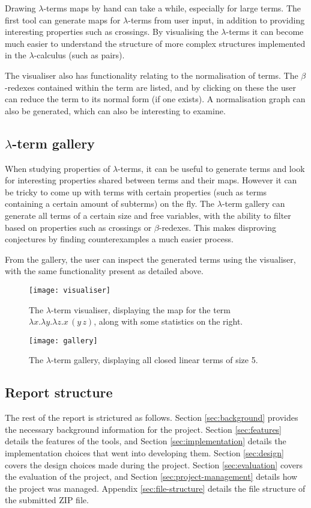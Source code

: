\documentclass[11pt]{article}
\begin{document}
Drawing $\lambda$-terms maps by hand can take a while, especially for large terms. The first tool can generate maps for $\lambda$-terms from user input, in addition to providing interesting properties such as crossings. By visualising the $\lambda$-terms it can become much easier to understand the structure of more complex structures implemented in the $\lambda$-calculus (such as pairs).

The visualiser also has functionality relating to the normalisation of terms. The $\beta$-redexes contained within the term are listed, and by clicking on these the user can reduce the term to its normal form (if one exists). A normalisation graph can also be generated, which can also be interesting to examine.

\subsection{\texorpdfstring{$\lambda$}{lambda}-term gallery}
When studying properties of $\lambda$-terms, it can be useful to generate terms and look for interesting properties shared between terms and their maps. However it can be tricky to come up with terms with certain properties (such as terms containing a certain amount of subterms) on the fly. The $\lambda$-term gallery can generate all terms of a certain size and free variables, with the ability to filter based on properties such as crossings or $\beta$-redexes. This makes disproving conjectures by finding counterexamples a much easier process.

From the gallery, the user can inspect the generated terms using the visualiser, with the same functionality present as detailed above.

\begin{figure}
    \centering
    \texttt{[image: visualiser]}
    \caption{The $\lambda$-term visualiser, displaying the map for the term $\lambda x. \lambda y. \lambda z. x \, (y \, z)$, along with some statistics on the right.}
    \label{fig:visualiser}
\end{figure}

\begin{figure}
    \centering
    \texttt{[image: gallery]}
    \caption{The $\lambda$-term gallery, displaying all closed linear terms of size 5.}
    \label{fig:gallery}
\end{figure}

\subsection{Report structure}
The rest of the report is strictured as follows. Section \ref{sec:background} provides the necessary background information for the project. Section \ref{sec:features} details the features of the tools, and Section \ref{sec:implementation} details the implementation choices that went into developing them. Section \ref{sec:design} covers the design choices made during the project. Section \ref{sec:evaluation} covers the evaluation of the project, and Section \ref{sec:project-management} details how the project was managed. Appendix \ref{sec:file-structure} details the file structure of the submitted ZIP file.
\end{document}
